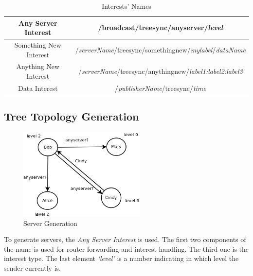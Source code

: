 \documentclass[conference]{IEEEtran}
\begin{document}
\begin{table}[!t]
\renewcommand{\arraystretch}{1.3}
\caption{Interests' Names}
\label{interest_name}
\centering
\begin{tabular}{|c|c|}
\hline
Any Server Interest & /broadcast/treesync/anyserver/\emph{level}\\
\hline
Something New Interest & /\emph{serverName}/treesync/somethingnew/\emph{mylabel}/\emph{dataName}\\
\hline
Anything New Interest & /\emph{serverName}/treesync/anythingnew/\emph{label1:label2:label3}\\
\hline
Data Interest & /\emph{publisherName}/treesync/\emph{time}\\
\hline
\end{tabular}
\end{table}


\subsection{Tree Topology Generation}
\begin{figure}[!t]
\centering
\includegraphics[width=2.5in]{../png/server-generation.png}
\caption{Server Generation}
\label{server_generation}
\end{figure}
To generate servers, the \emph{Any Server Interest} is used.
The first two components of the name is used for router forwarding and interest handling.
The third one is the interest type.
The last element \emph{`level'} is a number indicating in which level the sender currently is.
\end{document}
